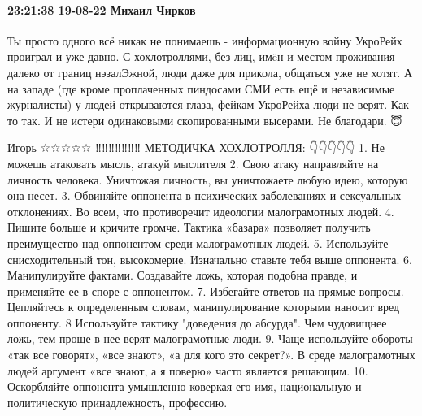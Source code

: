  
 
 
 
 

\paragraph{23:21:38 19-08-22 Михаил Чирков}

Ты просто одного всё никак не понимаешь - информационную войну УкроРейх проиграл и уже давно.
С хохлотроллями, без лиц, имëн и местом проживания далеко от границ нэзалЭжной, люди даже для прикола, общаться уже не хотят.
А на западе (где кроме проплаченных пиндосами СМИ есть ещё и независимые журналисты) у людей открываются глаза, фейкам УкроРейха люди не верят.
Как-то так.
И не истери одинаковыми скопированными высерами.
Не благодари. 😇


Игорь ☆☆☆☆☆
‼️‼️‼️‼️‼️‼️‼️
МЕТОДИЧКА ХОХЛОТРОЛЛЯ:
👇👇👇👇👇
1. Не можешь атаковать мысль, атакуй мыслителя
2. Свою атаку направляйте на личность человека. Уничтожая личность, вы уничтожаете любую идею, которую она несет.
3. Обвиняйте оппонента в психических заболеваниях и сексуальных отклонениях. Во всем, что противоречит идеологии малограмотных людей.
4. Пишите больше и кричите громче. Тактика «базара» позволяет получить преимущество над оппонентом среди малограмотных людей.
5. Используйте снисходительный тон, высокомерие. Изначально ставьте тебя выше оппонента.
6. Манипулируйте фактами. Создавайте ложь, которая подобна правде, и применяйте ее в споре с оппонентом.
7. Избегайте ответов на прямые вопросы. Цепляйтесь к определенным словам, манипулирование которыми наносит вред оппоненту.
8 Используйте тактику "доведения до абсурда". Чем чудовищнее ложь, тем проще в нее верят малограмотные люди.
9. Чаще используйте обороты «так все говорят», «все знают», «а для кого это секрет?». В среде малограмотных людей аргумент «все знают, а я поверю» часто является решающим.
10. Оскорбляйте оппонента умышленно коверкая его имя, национальную и политическую принадлежность, профессию.
